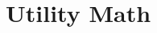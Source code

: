 \documentclass[]{article}
\newcommand{\vb}[1]{\bm{#1}} %
\begin{document}










\section{Utility Math}

\end{document}

